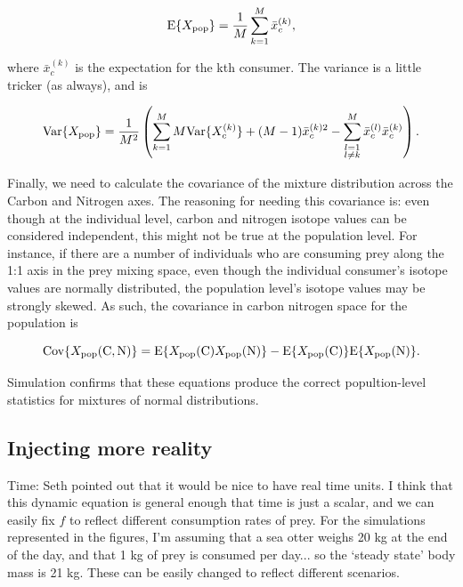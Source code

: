 \documentclass[11pt]{article}
\begin{document}
\begin{equation}
{\rm E}\{X_{\rm pop}\} = \frac{1}{M}\sum_{k=1}^M \bar{x}_c^{(k)},
\end{equation}

\noindent where $\bar{x}_c^{(k)}$ is the expectation for the kth consumer.
The variance is a little tricker (as always), and is

\begin{equation}
{\rm Var}\{X_{\rm pop}\} = \frac{1}{M^2}\left(\sum_{k=1}^M M {\rm Var}\{X_c^{(k)}\} + (M-1)	\bar{x}_c^{(k)2} - \sum_{\substack{
	l=1 \\
	l \neq k}							
	}^M  \bar{x}_c^{(l)} \bar{x}_c^{(k)} \right).
\end{equation}

\noindent Finally, we need to calculate the covariance of the mixture distribution across the Carbon and Nitrogen axes.
The reasoning for needing this covariance is: even though at the individual level, carbon and nitrogen isotope values can be considered independent, this might not be true at the population level.
For instance, if there are a number of individuals who are consuming prey along the 1:1 axis in the prey mixing space, even though the individual consumer's isotope values are normally distributed, the population level's isotope values may be strongly skewed.
As such, the covariance in carbon nitrogen space for the population is

\begin{equation}
{\rm Cov}\{X_{\rm pop}({\rm C, N})\} = {\rm E}\{X_{\rm pop}({\rm C})X_{\rm pop}({\rm N})\} - {\rm E}\{X_{\rm pop}({\rm C})\} {\rm E}\{X_{\rm pop}({\rm N})\}.
\end{equation}

\noindent Simulation confirms that these equations produce the correct popultion-level statistics for mixtures of normal distributions.


\subsection{Injecting more reality} 

Time: Seth pointed out that it would be nice to have real time units.
I think that this dynamic equation is general enough that time is just a scalar, and we can easily fix $f$ to reflect different consumption rates of prey.
For the simulations represented in the figures, I'm assuming that a sea otter weighs 20 kg at the end of the day, and that 1 kg of prey is consumed per day... so the `steady state' body mass is 21 kg.
These can be easily changed to reflect different scenarios.
\end{document}
